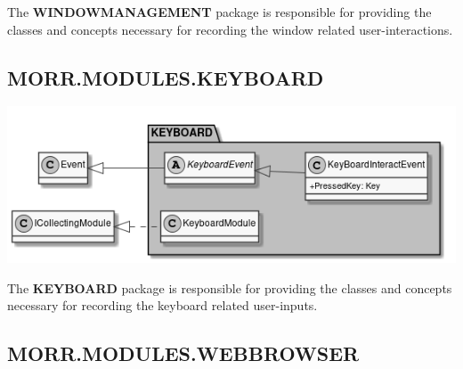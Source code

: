 The \textbf{WINDOWMANAGEMENT} package is responsible for providing the classes and concepts necessary for recording the window related user-interactions.

\begin{packclass}
\end{packclass}
\newpage
\subsection*{MORR.MODULES.KEYBOARD}

\begin{center}
    \includegraphics[width=1.0\textwidth]{resources/Packages/MODULES_KEYBOARD.png}
\end{center}

The \textbf{KEYBOARD} package is responsible for providing the classes and concepts necessary for recording the keyboard related user-inputs.

\begin{packclass}
\end{packclass}

\newpage
\subsection*{MORR.MODULES.WEBBROWSER}

